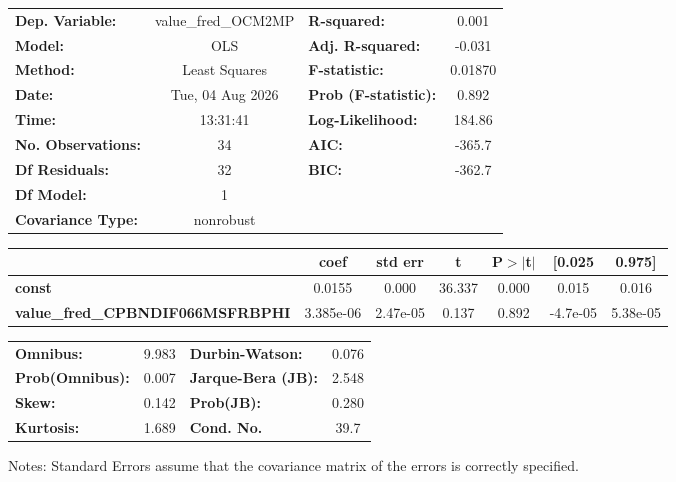 \begin{center}
\begin{tabular}{lclc}
\toprule
\textbf{Dep. Variable:}                  & value\_fred\_OCM2MP & \textbf{  R-squared:         } &     0.001   \\
\textbf{Model:}                          &         OLS         & \textbf{  Adj. R-squared:    } &    -0.031   \\
\textbf{Method:}                         &    Least Squares    & \textbf{  F-statistic:       } &   0.01870   \\
\textbf{Date:}                           &   Tue, 04 Aug 2026  & \textbf{  Prob (F-statistic):} &    0.892    \\
\textbf{Time:}                           &       13:31:41      & \textbf{  Log-Likelihood:    } &    184.86   \\
\textbf{No. Observations:}               &            34       & \textbf{  AIC:               } &    -365.7   \\
\textbf{Df Residuals:}                   &            32       & \textbf{  BIC:               } &    -362.7   \\
\textbf{Df Model:}                       &             1       & \textbf{                     } &             \\
\textbf{Covariance Type:}                &      nonrobust      & \textbf{                     } &             \\
\bottomrule
\end{tabular}
\begin{tabular}{lcccccc}
                                         & \textbf{coef} & \textbf{std err} & \textbf{t} & \textbf{P$> |$t$|$} & \textbf{[0.025} & \textbf{0.975]}  \\
\midrule
\textbf{const}                           &       0.0155  &        0.000     &    36.337  &         0.000        &        0.015    &        0.016     \\
\textbf{value\_fred\_CPBNDIF066MSFRBPHI} &    3.385e-06  &     2.47e-05     &     0.137  &         0.892        &     -4.7e-05    &     5.38e-05     \\
\bottomrule
\end{tabular}
\begin{tabular}{lclc}
\textbf{Omnibus:}       &  9.983 & \textbf{  Durbin-Watson:     } &    0.076  \\
\textbf{Prob(Omnibus):} &  0.007 & \textbf{  Jarque-Bera (JB):  } &    2.548  \\
\textbf{Skew:}          &  0.142 & \textbf{  Prob(JB):          } &    0.280  \\
\textbf{Kurtosis:}      &  1.689 & \textbf{  Cond. No.          } &     39.7  \\
\bottomrule
\end{tabular}
\end{center}

Notes: \newline
 [1] Standard Errors assume that the covariance matrix of the errors is correctly specified.
